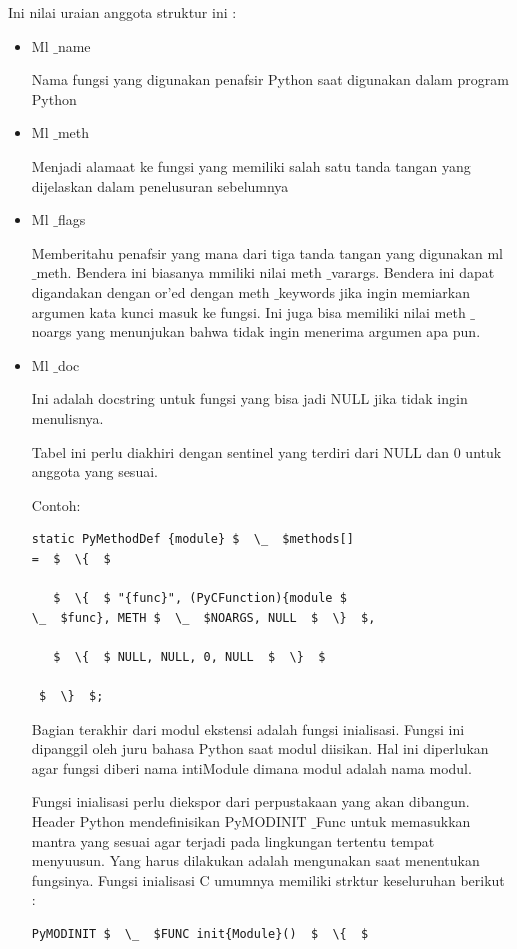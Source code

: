 \vspace{12pt}
Ini nilai uraian anggota struktur ini : 

\begin{itemize}
\item Ml $  \_  $name 

Nama fungsi yang digunakan penafsir Python saat digunakan dalam program Python 
\item Ml $  \_  $meth 

Menjadi alamaat ke fungsi yang memiliki salah satu tanda tangan yang dijelaskan dalam penelusuran sebelumnya 
\item Ml $  \_  $flags 

Memberitahu penafsir yang mana dari tiga tanda tangan yang digunakan ml $  \_  $meth. Bendera ini biasanya mmiliki nilai meth $  \_  $varargs. Bendera ini dapat digandakan dengan or’ed dengan meth $  \_  $keywords jika ingin memiarkan argumen kata kunci masuk ke fungsi. Ini juga bisa memiliki nilai meth $  \_  $noargs yang menunjukan bahwa tidak ingin menerima argumen apa pun. 
\item Ml $  \_  $doc 

Ini adalah docstring untuk fungsi yang bisa jadi NULL jika tidak ingin menulisnya. 
\vspace{12pt}

\hspace*{0.5in} Tabel ini perlu diakhiri dengan sentinel yang terdiri dari NULL dan 0 untuk anggota yang sesuai. 
\vspace{12pt}

Contoh: 
\begin{verbatim}
static PyMethodDef {module} $  \_  $methods[] 
=  $  \{  $ 

   $  \{  $ "{func}", (PyCFunction){module $
\_  $func}, METH $  \_  $NOARGS, NULL  $  \}  $, 

   $  \{  $ NULL, NULL, 0, NULL  $  \}  $ 

 $  \}  $; 
\end{verbatim}

\vspace{12pt}
\hspace*{0.5in} Bagian terakhir dari modul ekstensi adalah fungsi inialisasi. Fungsi ini dipanggil oleh juru bahasa Python saat modul diisikan. Hal ini diperlukan agar fungsi diberi nama intiModule dimana modul adalah nama modul. 

\hspace*{0.5in} Fungsi inialisasi perlu diekspor dari perpustakaan yang akan dibangun. Header Python mendefinisikan PyMODINIT $  \_  $Func untuk memasukkan mantra yang sesuai agar terjadi pada lingkungan tertentu tempat menyuusun. Yang harus dilakukan adalah mengunakan saat menentukan fungsinya. Fungsi inialisasi C umumnya memiliki strktur keseluruhan berikut : 
\begin{verbatim}
PyMODINIT $  \_  $FUNC init{Module}()  $  \{  $ 


\end{verbatim}
\end{itemize}
